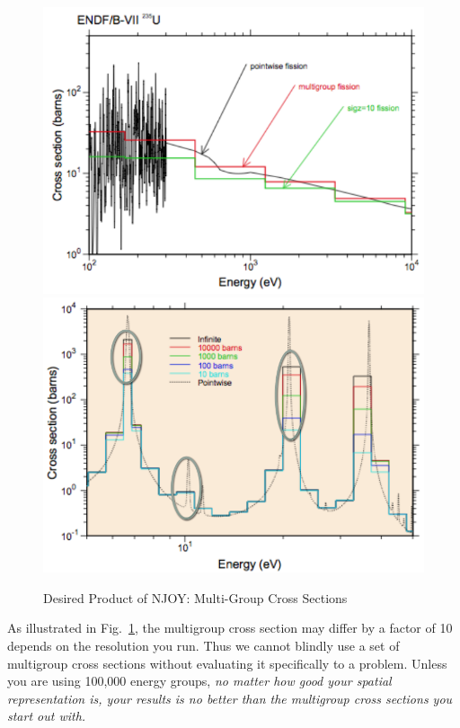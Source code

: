 \documentclass{school-22.211-notes}
\begin{document}
\begin{figure}[h]
  \centering
  \includegraphics[width=0.45\linewidth]{images/r-m/mg-xs.png}
  \includegraphics[width=0.45\linewidth]{images/r-m/mg-xs-2.png}
  \caption{Desired Product of NJOY: Multi-Group Cross Sections}\label{mg-xs}
\end{figure}
As illustrated in Fig.~\ref{mg-xs}, the multigroup cross section may differ by a factor of 10 depends on the resolution you run. Thus we cannot blindly use a set of multigroup cross sections without evaluating it specifically to a problem. Unless you are using 100,000 energy groups, \textit{no matter how good your spatial representation is, your results is no better than the multigroup cross sections you start out with.} 
\end{document}
